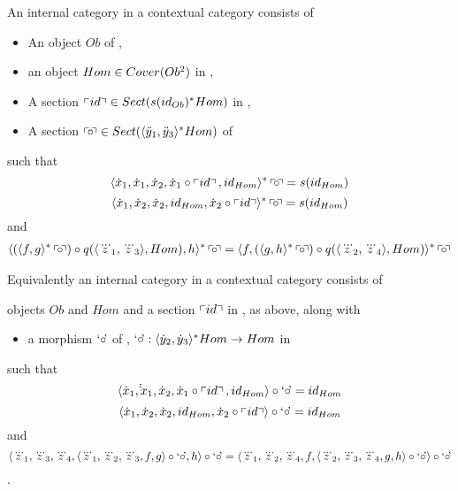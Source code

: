 \begin{lemma}
\label{internalcategorylemma}
An internal category in a contextual category \catcw consists of
\begin{itemize}
\item An object $Ob$ of \catc,
\item an object $Hom \in Cover(Ob^2)$ in \catc,
\item A section $\left\ulcorner id\right\urcorner \in Sect(s(id_{Ob})^*Hom)$ in \catc, 
\item A section $\left\ulcorner\kern-2pt\circ \kern-2pt\right\urcorner \in Sect(\langle\ddot y_1,\ddot y_3\rangle^*Hom) $ of \catc 											
\end{itemize}
such that
\begin{equation}
\label{leftidentityaxiom}
\leftidentitymapped
\end{equation}
\begin{equation}
\label{rightidentityaxiom}
\rightidentitymapped
\end{equation}
and
\begin{multline}
\label{associativityaxiom}
\assoclhsremapped = \assocrhsremapped
\end{multline}


Equivalently an internal category in a contextual category \catcw consists of
\item objects $Ob$ and  $Hom$  and a section $\left\ulcorner id\right\urcorner$ in \catc,  as above, along with
\begin{itemize}
\item a morphism $\text{`$\circ$\kern-2pt'}$ of \catc, $\text{`$\circ$\kern-2pt'}: \langle\dot y_2,\dot y_3\rangle^*Hom \rightarrow Hom$ in \catc
\end{itemize}
such that
\begin{equation}
\label{leftidentityrepresentation2}
\tuple{\dot x_1,\dot \dot x_1,\dot x_2,\dot x_1\circ \fid,id_{Hom}} \circ \compmorph =id_{Hom}
\end{equation}
\begin{equation}
\label{rightidentityrepresentation2}
\tuple{\dot x_1,\dot x_2,\dot x_2,id_{Hom},\dot x_2 \circ \fid} \circ \compmorph =id_{Hom}
\end{equation}
and
\begin{equation}
\label{associativityrepresentation2}
\assocequivalentlhs = \assocequivalentrhs
\end{equation}.
\end{lemma}
